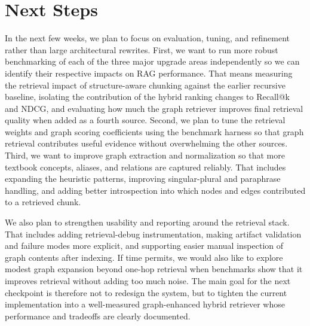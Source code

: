 \documentclass[11pt]{article}
\begin{document}
\section*{Next Steps}
In the next few weeks, we plan to focus on evaluation, tuning, and refinement rather than large architectural rewrites. First, we want to run more robust benchmarking of each of the three major upgrade areas independently so we can identify their respective impacts on RAG performance. That means measuring the retrieval impact of structure-aware chunking against the earlier recursive baseline, isolating the contribution of the hybrid ranking changes to Recall@k and NDCG, and evaluating how much the graph retriever improves final retrieval quality when added as a fourth source. Second, we plan to tune the retrieval weights and graph scoring coefficients using the benchmark harness so that graph retrieval contributes useful evidence without overwhelming the other sources. Third, we want to improve graph extraction and normalization so that more textbook concepts, aliases, and relations are captured reliably. That includes expanding the heuristic patterns, improving singular-plural and paraphrase handling, and adding better introspection into which nodes and edges contributed to a retrieved chunk.

We also plan to strengthen usability and reporting around the retrieval stack. That includes adding retrieval-debug instrumentation, making artifact validation and failure modes more explicit, and supporting easier manual inspection of graph contents after indexing. If time permits, we would also like to explore modest graph expansion beyond one-hop retrieval when benchmarks show that it improves retrieval without adding too much noise. The main goal for the next checkpoint is therefore not to redesign the system, but to tighten the current implementation into a well-measured graph-enhanced hybrid retriever whose performance and tradeoffs are clearly documented.
\end{document}
